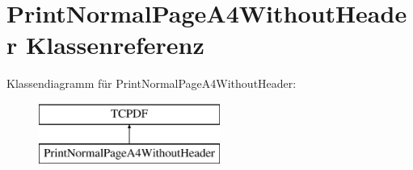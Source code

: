 \hypertarget{class_print_normal_page_a4_without_header}{}\section{Print\+Normal\+Page\+A4\+Without\+Header Klassenreferenz}
\label{class_print_normal_page_a4_without_header}
Klassendiagramm für Print\+Normal\+Page\+A4\+Without\+Header\+:\begin{figure}[H]
\begin{center}
\leavevmode
\includegraphics[height=2.000000cm]{class_print_normal_page_a4_without_header}
\end{center}
\end{figure}
